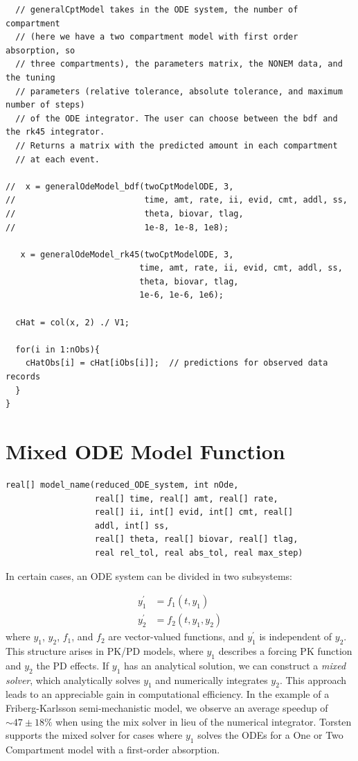 \documentclass[11pt, reqno]{amsbook}
\numberwithin{section}{chapter}
\theoremstyle{remark}
\begin{document}
\begin{verbatim}
  // generalCptModel takes in the ODE system, the number of compartment 
  // (here we have a two compartment model with first order absorption, so
  // three compartments), the parameters matrix, the NONEM data, and the tuning
  // parameters (relative tolerance, absolute tolerance, and maximum number of steps)
  // of the ODE integrator. The user can choose between the bdf and the rk45 integrator.
  // Returns a matrix with the predicted amount in each compartment 
  // at each event.

//  x = generalOdeModel_bdf(twoCptModelODE, 3,
//                          time, amt, rate, ii, evid, cmt, addl, ss,
//                          theta, biovar, tlag,
//                          1e-8, 1e-8, 1e8);

   x = generalOdeModel_rk45(twoCptModelODE, 3,
                           time, amt, rate, ii, evid, cmt, addl, ss,
                           theta, biovar, tlag,
                           1e-6, 1e-6, 1e6);

  cHat = col(x, 2) ./ V1;

  for(i in 1:nObs){
    cHatObs[i] = cHat[iObs[i]];  // predictions for observed data records
  }
}
\end{verbatim}

\section{Mixed ODE Model Function}
\label{sec:org2f7aebe}

\begin{verbatim}
real[] model_name(reduced_ODE_system, int nOde,
                  real[] time, real[] amt, real[] rate,
                  real[] ii, int[] evid, int[] cmt, real[]
                  addl, int[] ss,
                  real[] theta, real[] biovar, real[] tlag,
                  real rel_tol, real abs_tol, real max_step)
\end{verbatim}

In certain cases, an ODE system can be divided in two subsystems:

\begin{align*}
  y_1^\prime &= f_1(t, y_1) \\
  y_2^\prime &= f_2(t, y_1, y_2)
\end{align*}
where \(y_1\), \(y_2\), \(f_1\), and \(f_2\) are vector-valued functions, and
\(y_1^\prime\) is independent of \(y_2\). This structure arises in PK/PD
models, where \(y_1\) describes a forcing PK function and \(y_2\) the PD
effects. If \(y_1\) has an analytical solution, we can construct a
\textit{mixed solver}, which analytically solves \(y_1\) and numerically
integrates \(y_2\). This approach leads to an appreciable gain in
computational efficiency. In the example of a Friberg-Karlsson
semi-mechanistic model, we observe an average speedup of
\(\sim 47 \pm 18 \%\) when using the mix solver in lieu of the numerical
integrator. Torsten supports the mixed solver for
cases where \(y_1\) solves the ODEs for a One or Two Compartment model
with a first-order absorption.
\end{document}
